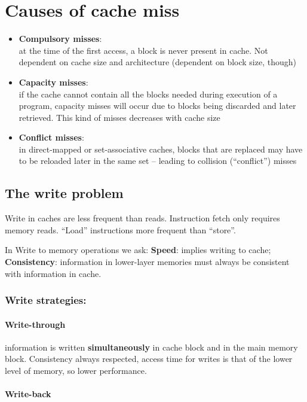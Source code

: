 \section{Causes of cache miss}
\begin{itemize}
    \item \textbf{Compulsory misses}:\\
    at the time of the first access, a block is never present in cache. Not dependent on cache size and architecture (dependent on block size, though)
    \item \textbf{Capacity misses}:\\
    if the cache cannot contain all the blocks needed during execution of a program, capacity misses will occur due to blocks being discarded and later retrieved. This kind of misses decreases with cache size
    \item \textbf{Conflict misses}:\\
    in direct-mapped or set-associative caches, blocks that are replaced may have to be reloaded later in the same set – leading to collision (“conflict”) misses
\end{itemize}

\subsection{The write problem}
Write in caches are less frequent than reads.
Instruction fetch only requires memory reads.
“Load” instructions more frequent than “store”.

In Write to memory operations we ask:
\textbf{Speed}: implies writing to cache;
\textbf{Consistency}: information in lower-layer memories must always be consistent with information in cache.

\subsubsection{Write strategies:}
\paragraph{Write-through}
information is written \textbf{simultaneously} in cache block and in the main memory block. Consistency always respected, access time for writes is that of the lower level of memory, so lower performance.

\paragraph{Write-back}

